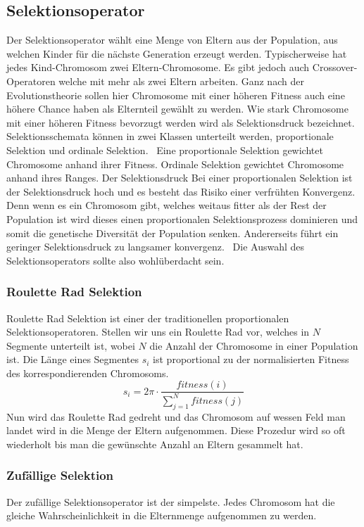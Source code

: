 \subsection{Selektionsoperator}
Der Selektionsoperator wählt eine Menge von Eltern aus der Population, aus welchen Kinder für die nächste Generation erzeugt werden. Typischerweise hat jedes Kind-Chromosom zwei Eltern-Chromosome. Es gibt jedoch auch Crossover-Operatoren welche mit mehr als zwei Eltern arbeiten. Ganz nach der Evolutionstheorie sollen hier Chromosome mit einer höheren Fitness auch eine höhere Chance haben als Elternteil gewählt zu werden. Wie stark Chromosome mit einer höheren Fitness bevorzugt werden wird als Selektionsdruck bezeichnet. Selektionsschemata können in zwei Klassen unterteilt werden, proportionale Selektion und ordinale Selektion.~\cite*{TerminologiesAndOperators} Eine proportionale Selektion gewichtet Chromosome anhand ihrer Fitness. Ordinale Selektion gewichtet Chromosome anhand ihres Ranges. Der Selektionsdruck Bei einer proportionalen Selektion ist der Selektionsdruck hoch und es besteht das Risiko einer verfrühten Konvergenz. Denn wenn es ein Chromosom gibt, welches weitaus fitter als der Rest der Population ist wird dieses einen proportionalen Selektionsprozess dominieren und somit die genetische 
Diversität der Population senken. Andererseits führt ein geringer Selektionsdruck zu langsamer konvergenz.~\cite{TerminologiesAndOperators}
Die Auswahl des Selektionsoperators sollte also wohlüberdacht sein.

\subsubsection*{Roulette Rad Selektion}
Roulette Rad Selektion ist einer der traditionellen proportionalen Selektionsoperatoren. Stellen wir uns ein Roulette Rad vor, welches in $N$ Segmente unterteilt ist, wobei $N$ die Anzahl der Chromosome in einer Population ist. Die Länge eines Segmentes $s_i$ ist proportional zu der normalisierten Fitness des korrespondierenden Chromosoms.
\begin{equation}
    s_i = 2 \pi \cdot \frac{fitness(i)}{\sum_{j=1}^{N} fitness(j)}
\end{equation}
Nun wird das Roulette Rad gedreht und das Chromosom auf wessen Feld man landet wird in die Menge der Eltern aufgenommen. Diese Prozedur wird so oft wiederholt bis man die gewünschte Anzahl an Eltern gesammelt hat.

\subsubsection*{Zufällige Selektion}
Der zufällige Selektionsoperator ist der simpelste. Jedes Chromosom hat die gleiche Wahrscheinlichkeit in die Elternmenge aufgenommen zu werden.

